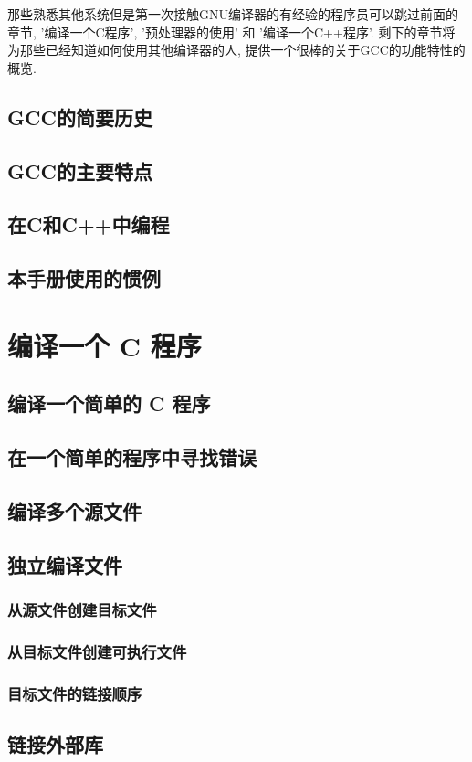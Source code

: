 \documentclass[lang=cn,12pt,newtx,scheme=chinese]{elegantbook}
\begin{document}
那些熟悉其他系统但是第一次接触GNU编译器的有经验的程序员可以跳过前面的章节, '编译一个C程序', '预处理器的使用' 和 '编译一个C++程序'. 剩下的章节将为那些已经知道如何使用其他编译器的人, 提供一个很棒的关于GCC的功能特性的概览.
\section{GCC的简要历史}
\section{GCC的主要特点}
\section{在C和C++中编程}
\section{本手册使用的惯例}

\chapter{编译一个 C 程序}
\section{编译一个简单的 C 程序}
\section{在一个简单的程序中寻找错误}
\section{编译多个源文件}
\section{独立编译文件}
\subsection{从源文件创建目标文件}
\subsection{从目标文件创建可执行文件}
\subsection{目标文件的链接顺序}
\section{链接外部库}
\end{document}
